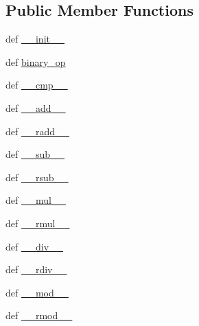 \subsection*{Public Member Functions}
\begin{DoxyCompactItemize}
\item 
def \hyperlink{classscipy_1_1weave_1_1size__check_1_1dummy__array_addaeb5d02daade536d64bf0c5f99e5db}{\+\_\+\+\_\+init\+\_\+\+\_\+}
\item 
def \hyperlink{classscipy_1_1weave_1_1size__check_1_1dummy__array_a17853c4b9e0dec1698f1a6498d99e601}{binary\+\_\+op}
\item 
def \hyperlink{classscipy_1_1weave_1_1size__check_1_1dummy__array_adfa0d272711cac4f88ff61c820923dda}{\+\_\+\+\_\+cmp\+\_\+\+\_\+}
\item 
def \hyperlink{classscipy_1_1weave_1_1size__check_1_1dummy__array_aef4aa3af523cfd82671249af0355b86c}{\+\_\+\+\_\+add\+\_\+\+\_\+}
\item 
def \hyperlink{classscipy_1_1weave_1_1size__check_1_1dummy__array_ad0b485e365ceefba54eec82cc7efaa10}{\+\_\+\+\_\+radd\+\_\+\+\_\+}
\item 
def \hyperlink{classscipy_1_1weave_1_1size__check_1_1dummy__array_a79a178948ebe87c0d01c63b0bef44522}{\+\_\+\+\_\+sub\+\_\+\+\_\+}
\item 
def \hyperlink{classscipy_1_1weave_1_1size__check_1_1dummy__array_a869cc8f90d526788fce8b1217b363d8b}{\+\_\+\+\_\+rsub\+\_\+\+\_\+}
\item 
def \hyperlink{classscipy_1_1weave_1_1size__check_1_1dummy__array_a87020cf587f0dfb1ee67382e7123807d}{\+\_\+\+\_\+mul\+\_\+\+\_\+}
\item 
def \hyperlink{classscipy_1_1weave_1_1size__check_1_1dummy__array_a1088c6aded8033f163a816ec75a4f4c4}{\+\_\+\+\_\+rmul\+\_\+\+\_\+}
\item 
def \hyperlink{classscipy_1_1weave_1_1size__check_1_1dummy__array_a65ecbafaaeb373ac037075514b0d2763}{\+\_\+\+\_\+div\+\_\+\+\_\+}
\item 
def \hyperlink{classscipy_1_1weave_1_1size__check_1_1dummy__array_afff83bb7b5fe1c6b5619b28b464ca11b}{\+\_\+\+\_\+rdiv\+\_\+\+\_\+}
\item 
def \hyperlink{classscipy_1_1weave_1_1size__check_1_1dummy__array_a0de083c3fc09f3837161caf5081099bf}{\+\_\+\+\_\+mod\+\_\+\+\_\+}
\item 
def \hyperlink{classscipy_1_1weave_1_1size__check_1_1dummy__array_a0179585e14e87601f4ee4726482542a3}{\+\_\+\+\_\+rmod\+\_\+\+\_\+}
\item 

\end{DoxyCompactItemize}

